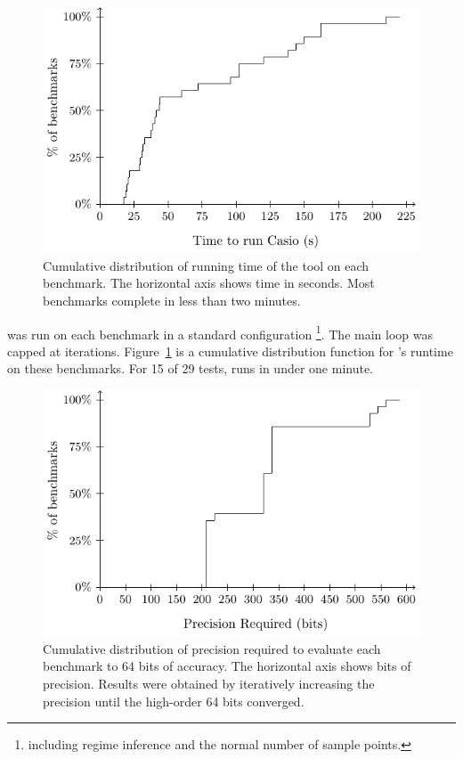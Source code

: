 \documentclass[paper.tex]{subfiles}
\begin{document}
\begin{figure}
\includegraphics[width=0.9\columnwidth]{fig/eval-casio-time.pdf}
\caption{Cumulative distribution of running time of the \casio tool on
  each benchmark. The horizontal axis shows time in seconds. Most
  benchmarks complete in less than two minutes.}
\label{fig:eval-casio-time}
\end{figure}

\casio was run on each benchmark in a standard configuration%
\footnote{including regime inference and the normal number of sample
  points.}.  The main loop was capped at \nIters iterations.
Figure~\ref{fig:eval-casio-time} is a cumulative distribution function for
\casio's runtime on these benchmarks.  For 15 of 29 tests, \casio runs
in under one minute.

\begin{figure}
\includegraphics[width=0.9\columnwidth]{fig/eval-mpfr-bits.pdf}
\caption{Cumulative distribution of precision required to evaluate
  each benchmark to 64 bits of accuracy. The horizontal axis shows
  bits of precision. Results were obtained by iteratively increasing
  the precision until the high-order 64 bits converged.}
\label{fig:eval-mpfr-bits}
\end{figure}
\end{document}
